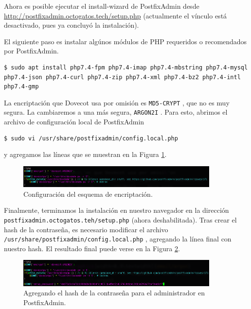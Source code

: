 \documentclass{article}
\newcommand{\ttt}[1]{%
\texttt{#1}%
}
\begin{document}
Ahora es posible ejecutar el install-wizard de
PostfixAdmin desde \href{http://postfixadmin.octogatos.tech/setup.php}{http://postfixadmin.octogatos.tech/setup.php}
(actualmente el v\'inculo est\'a desactivado, pues
ya concluy\'o la instalaci\'on).

El siguiente paso es instalar alg\'unos m\'odulos
de PHP requeridos o recomendados por PostfixAdmin.
\begin{lstlisting}
$ sudo apt install php7.4-fpm php7.4-imap php7.4-mbstring php7.4-mysql php7.4-json php7.4-curl php7.4-zip php7.4-xml php7.4-bz2 php7.4-intl php7.4-gmp
\end{lstlisting}

La encriptaci\'on que Dovecot usa por omisi\'on
es \ttt{MD5-CRYPT}, que no es muy segura.  La cambiaremos
a una m\'as segura, \ttt{ARGON2I}.   Para esto,
abrimos el archivo de configuraci\'on local de
PostfixAdmin
\begin{lstlisting}
$ sudo vi /usr/share/postfixadmin/config.local.php
\end{lstlisting}
y agregamos las l\'ineas que se muestran en la
Figura \ref{fig:email-argon}.

\begin{figure}[H]
  \centering
  \includegraphics[width=0.9\textwidth]{email/argon}
  \caption{Configuraci\'on del esquema de encriptaci\'on.}
  \label{fig:email-argon}
\end{figure}
Finalmente, terminamos la instalaci\'on en nuestro
navegador en la direcci\'on
\ttt{postfixadmin.octogatos.teh/setup.php} (ahora
deshabilitada).   Tras crear el hash de la contrase\~na,
es necesario modificar el archivo \\
\ttt{/usr/share/postfixadmin/config.local.php}, agregando
la l\'inea final con nuestro hash.   El resultado final
puede verse en la Figura \ref{fig:email-hash}.
\begin{figure}[H]
  \centering
  \includegraphics[width=0.9\textwidth]{email/hash}
  \caption{Agregando el hash de la contrase\~na para el
           administrador en PostfixAdmin.}
  \label{fig:email-hash}
\end{figure}
\end{document}
